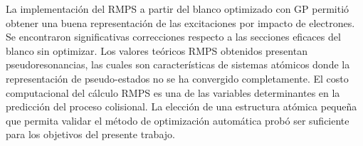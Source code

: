 La implementación del RMPS a partir del blanco optimizado con GP 
permitió obtener una buena representación de las excitaciones por 
impacto de electrones. Se encontraron significativas correcciones 
respecto a las secciones eficaces del blanco sin optimizar. Los valores 
teóricos RMPS obtenidos presentan pseudoresonancias, las cuales son 
características de sistemas atómicos donde la representación de 
pseudo-estados no se ha convergido completamente. 
El costo computacional del cálculo RMPS es una de las variables 
determinantes en la predicción del proceso colisional. La elección de 
una estructura atómica pequeña que permita validar el método de 
optimización automática probó ser suficiente para los objetivos del 
presente trabajo. 




